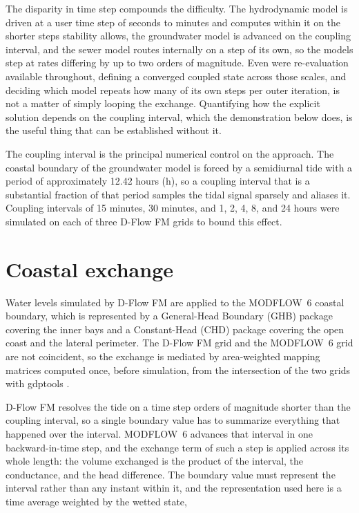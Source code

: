 \documentclass[preprint,authoryear,11pt]{elsarticle}
\begin{document}
The disparity in time step compounds the difficulty. The hydrodynamic model is driven at a user time step of seconds to minutes and computes within it on the shorter steps stability allows, the groundwater model is advanced on the coupling interval, and the sewer model routes internally on a step of its own, so the models step at rates differing by up to two orders of magnitude. Even were re-evaluation available throughout, defining a converged coupled state across those scales, and deciding which model repeats how many of its own steps per outer iteration, is not a matter of simply looping the exchange. Quantifying how the explicit solution depends on the coupling interval, which the demonstration below does, is the useful thing that can be established without it.

The coupling interval is the principal numerical control on the approach. The coastal boundary of the groundwater model is forced by a semidiurnal tide with a period of approximately 12.42 hours (\si{\hour}), so a coupling interval that is a substantial fraction of that period samples the tidal signal sparsely and aliases it. Coupling intervals of 15 minutes, 30 minutes, and 1, 2, 4, 8, and 24 hours were simulated on each of three D-Flow FM grids to bound this effect.

\section{Coastal exchange}

Water levels simulated by D-Flow FM are applied to the MODFLOW~6 coastal boundary, which is represented by a General-Head Boundary (GHB) package covering the inner bays and a Constant-Head (CHD) package covering the open coast and the lateral perimeter. The D-Flow FM grid and the MODFLOW~6 grid are not coincident, so the exchange is mediated by area-weighted mapping matrices computed once, before simulation, from the intersection of the two grids with gdptools \citep{mcdonald2024gdptools}.

D-Flow FM resolves the tide on a time step orders of magnitude shorter than the coupling interval, so a single boundary value has to summarize everything that happened over the interval. MODFLOW~6 advances that interval in one backward-in-time step, and the exchange term of such a step is applied across its whole length: the volume exchanged is the product of the interval, the conductance, and the head difference. The boundary value must represent the interval rather than any instant within it, and the representation used here is a time average weighted by the wetted state,
\end{document}
